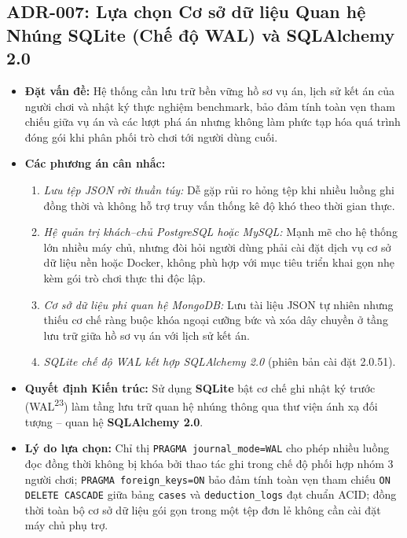 \subsection{ADR-007: Lựa chọn Cơ sở dữ liệu Quan hệ Nhúng SQLite (Chế độ WAL) và SQLAlchemy 2.0}
\begin{itemize}[leftmargin=1.5cm]
    \item \textbf{Đặt vấn đề:} Hệ thống cần lưu trữ bền vững hồ sơ vụ án, lịch sử kết án của người chơi và nhật ký thực nghiệm benchmark, bảo đảm tính toàn vẹn tham chiếu giữa vụ án và các lượt phá án nhưng không làm phức tạp hóa quá trình đóng gói khi phân phối trò chơi tới người dùng cuối.
    \item \textbf{Các phương án cân nhắc:}
    \begin{enumerate}
        \item \textit{Lưu tệp JSON rời thuần túy:} Dễ gặp rủi ro hỏng tệp khi nhiều luồng ghi đồng thời và không hỗ trợ truy vấn thống kê độ khó theo thời gian thực.
        \item \textit{Hệ quản trị khách--chủ PostgreSQL hoặc MySQL:} Mạnh mẽ cho hệ thống lớn nhiều máy chủ, nhưng đòi hỏi người dùng phải cài đặt dịch vụ cơ sở dữ liệu nền hoặc Docker, không phù hợp với mục tiêu triển khai gọn nhẹ kèm gói trò chơi thực thi độc lập.
        \item \textit{Cơ sở dữ liệu phi quan hệ MongoDB:} Lưu tài liệu JSON tự nhiên nhưng thiếu cơ chế ràng buộc khóa ngoại cưỡng bức và xóa dây chuyền ở tầng lưu trữ giữa hồ sơ vụ án với lịch sử kết án.
        \item \textit{SQLite chế độ WAL kết hợp SQLAlchemy 2.0} (phiên bản cài đặt 2.0.51).
    \end{enumerate}
    \item \textbf{Quyết định Kiến trúc:} Sử dụng \textbf{SQLite} bật cơ chế ghi nhật ký trước (WAL\textsuperscript{23}) làm tầng lưu trữ quan hệ nhúng thông qua thư viện ánh xạ đối tượng -- quan hệ \textbf{SQLAlchemy 2.0}.
    \item \textbf{Lý do lựa chọn:} Chỉ thị \texttt{PRAGMA journal\_mode=WAL} cho phép nhiều luồng đọc đồng thời không bị khóa bởi thao tác ghi trong chế độ phối hợp nhóm 3 người chơi; \texttt{PRAGMA foreign\_keys=ON} bảo đảm tính toàn vẹn tham chiếu \texttt{ON DELETE CASCADE} giữa bảng \texttt{cases} và \texttt{deduction\_logs} đạt chuẩn ACID; đồng thời toàn bộ cơ sở dữ liệu gói gọn trong một tệp đơn lẻ không cần cài đặt máy chủ phụ trợ.
\end{itemize}

